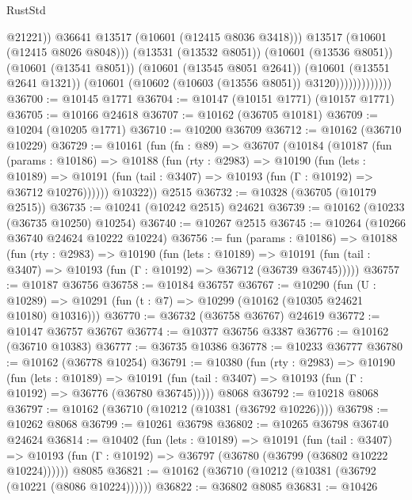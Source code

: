 \begin{lexlean}{RustStd}
\begin{coremodule}
                                  @21221))
                              @36641
                              @13517
                              (@10601 (@12415 @8036 @3418)))
                            @13517
                            (@10601 (@12415 @8026 @8048)))
                          (@13531 (@13532 @8051))
                          (@10601 (@13536 @8051))
                          (@10601 (@13541 @8051))
                          (@10601 (@13545 @8051 @2641))
                          (@10601 (@13551 @2641 @1321))
                          (@10601 (@10602 (@10603 (@13556 @8051)) @3120)))))))))))))
@36700 := @10145 @1771
@36704 := @10147 (@10151 @1771) (@10157 @1771)
@36705 := @10166 @24618
@36707 := @10162 (@36705 @10181)
@36709 := @10204 (@10205 @1771)
@36710 := @10200 @36709
@36712 := @10162 (@36710 @10229)
@36729 := @10161
    (fun (fn : @89) =>
    @36707
      (@10184
        (@10187
          (fun (params : @10186) =>
          @10188
            (fun (rty : @2983) =>
            @10190
              (fun (lets : @10189) =>
              @10191 (fun (tail : @3407) => @10193 (fun (Γ : @10192) => @36712 @10276))))))
        @10322))
    @2515
@36732 := @10328 (@36705 (@10179 @2515))
@36735 := @10241 (@10242 @2515) @24621
@36739 := @10162 (@10233 (@36735 @10250) @10254)
@36740 := @10267 @2515
@36745 := @10264 (@10266 @36740 @24624 @10222 @10224)
@36756 := fun (params : @10186) =>
  @10188
    (fun (rty : @2983) =>
    @10190
      (fun (lets : @10189) =>
      @10191 (fun (tail : @3407) => @10193 (fun (Γ : @10192) => @36712 (@36739 @36745)))))
@36757 := @10187 @36756
@36758 := @10184 @36757
@36767 := @10290
    (fun (U : @10289) => @10291 (fun (t : @7) => @10299 (@10162 (@10305 @24621 @10180) @10316)))
@36770 := @36732 (@36758 @36767) @24619
@36772 := @10147 @36757 @36767
@36774 := @10377 @36756 @3387
@36776 := @10162 (@36710 @10383)
@36777 := @36735 @10386
@36778 := @10233 @36777
@36780 := @10162 (@36778 @10254)
@36791 := @10380
    (fun (rty : @2983) =>
    @10190
      (fun (lets : @10189) =>
      @10191 (fun (tail : @3407) => @10193 (fun (Γ : @10192) => @36776 (@36780 @36745)))))
    @8068
@36792 := @10218 @8068
@36797 := @10162 (@36710 (@10212 (@10381 (@36792 @10226))))
@36798 := @10262 @8068
@36799 := @10261 @36798
@36802 := @10265 @36798 @36740 @24624
@36814 := @10402
    (fun (lets : @10189) =>
    @10191
      (fun (tail : @3407) =>
      @10193 (fun (Γ : @10192) => @36797 (@36780 (@36799 (@36802 @10222 @10224))))))
    @8085
@36821 := @10162 (@36710 (@10212 (@10381 (@36792 (@10221 (@8086 @10224))))))
@36822 := @36802 @8085
@36831 := @10426

\end{coremodule}
\end{lexlean}
